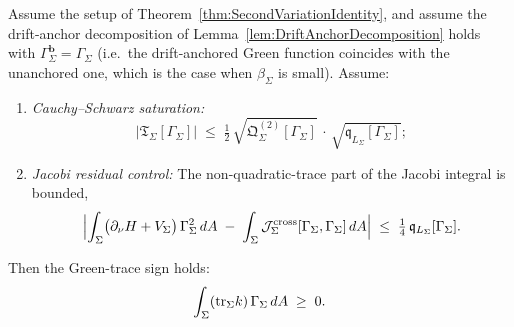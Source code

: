 \begin{theorem}\label{thm:GreenSignSecondVariation}
Assume the setup of Theorem~\ref{thm:SecondVariationIdentity}, and assume the drift-anchor decomposition of Lemma~\ref{lem:DriftAnchorDecomposition} holds with $\Gamma_\Sigma^{\mathbf b}=\Gamma_\Sigma$ (i.e.\ the drift-anchored Green function coincides with the unanchored one, which is the case when $\beta_\Sigma$ is small). Assume:
\begin{enumerate}
    \item[\textup{(H6)}] \emph{Cauchy--Schwarz saturation:}
    \begin{equation}\label{eq:CauchySchwarzSaturation}
        \bigl|\mathfrak T_\Sigma[\Gamma_\Sigma]\bigr|
        \;\le\;
        \tfrac12\,\sqrt{\mathfrak Q_\Sigma^{(2)}[\Gamma_\Sigma]}\,\cdot\,
        \sqrt{\mathfrak q_{L_\Sigma}[\Gamma_\Sigma]} ;
    \end{equation}
    \item[\textup{(H7)}] \emph{Jacobi residual control:} The non-quadratic-trace part of the Jacobi integral is bounded,
    \begin{equation}\label{eq:JacobiResidual}
        \Bigl|\int_\Sigma\bigl(\partial_\nu H + V_\Sigma\bigr)\,\Gamma_\Sigma^2\,dA
        \;-\;\int_\Sigma\mathcal J_\Sigma^{\mathrm{cross}}[\Gamma_\Sigma,\Gamma_\Sigma]\,dA\Bigr|
        \;\le\;
        \tfrac14\,\mathfrak q_{L_\Sigma}[\Gamma_\Sigma] .
    \end{equation}
\end{enumerate}
Then the Green-trace sign holds:
\begin{equation}\label{eq:GreenSignSecondVariation}
    \int_\Sigma(\mathrm{tr}_\Sigma k)\,\Gamma_\Sigma\,dA\;\ge\;0 .
\end{equation}
\end{theorem}

